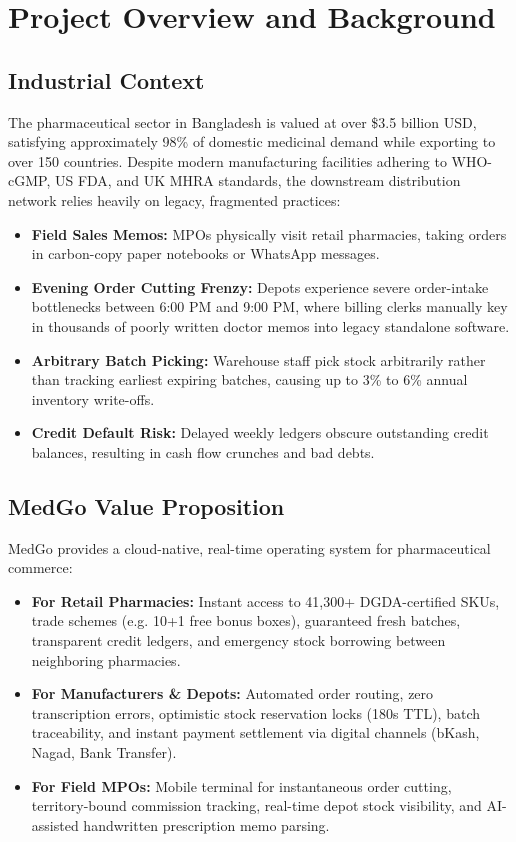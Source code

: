 \documentclass[10pt,a4paper]{article}
\begin{document}
\section{Project Overview and Background}
\subsection{Industrial Context}
The pharmaceutical sector in Bangladesh is valued at over \$3.5 billion USD, satisfying approximately 98\% of domestic medicinal demand while exporting to over 150 countries. Despite modern manufacturing facilities adhering to WHO-cGMP, US FDA, and UK MHRA standards, the downstream distribution network relies heavily on legacy, fragmented practices:
\begin{itemize}[leftmargin=*]
    \item \textbf{Field Sales Memos:} MPOs physically visit retail pharmacies, taking orders in carbon-copy paper notebooks or WhatsApp messages.
    \item \textbf{Evening Order Cutting Frenzy:} Depots experience severe order-intake bottlenecks between 6:00 PM and 9:00 PM, where billing clerks manually key in thousands of poorly written doctor memos into legacy standalone software.
    \item \textbf{Arbitrary Batch Picking:} Warehouse staff pick stock arbitrarily rather than tracking earliest expiring batches, causing up to 3\% to 6\% annual inventory write-offs.
    \item \textbf{Credit Default Risk:} Delayed weekly ledgers obscure outstanding credit balances, resulting in cash flow crunches and bad debts.
\end{itemize}

\subsection{MedGo Value Proposition}
MedGo provides a cloud-native, real-time operating system for pharmaceutical commerce:
\begin{itemize}[leftmargin=*]
    \item \textbf{For Retail Pharmacies:} Instant access to 41,300+ DGDA-certified SKUs, trade schemes (e.g. 10+1 free bonus boxes), guaranteed fresh batches, transparent credit ledgers, and emergency stock borrowing between neighboring pharmacies.
    \item \textbf{For Manufacturers \& Depots:} Automated order routing, zero transcription errors, optimistic stock reservation locks (180s TTL), batch traceability, and instant payment settlement via digital channels (bKash, Nagad, Bank Transfer).
    \item \textbf{For Field MPOs:} Mobile terminal for instantaneous order cutting, territory-bound commission tracking, real-time depot stock visibility, and AI-assisted handwritten prescription memo parsing.
\end{itemize}
\end{document}
